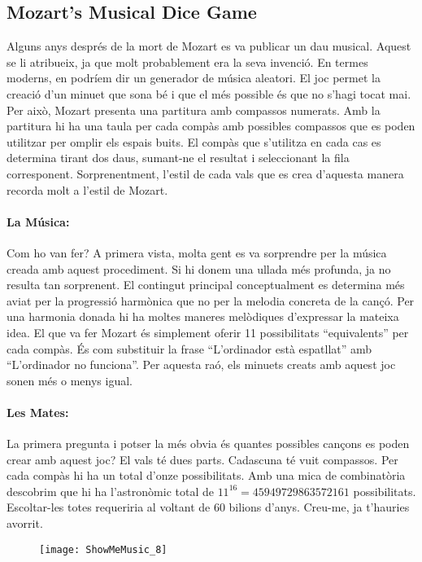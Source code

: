 \subsection{Mozart's Musical Dice Game}
Alguns anys després de la mort de Mozart es va publicar un dau musical. Aquest se li atribueix, ja que molt probablement era la seva invenció. En termes moderns, en podríem dir un generador de música aleatori. El joc permet la creació d'un minuet que sona bé i que el més possible és que no s'hagi tocat mai. Per això, Mozart presenta una partitura amb compassos numerats. Amb la partitura hi ha una taula per cada compàs amb possibles compassos que es poden utilitzar per omplir els espais buits. El compàs que s'utilitza en cada cas es determina tirant dos daus, sumant-ne el resultat i seleccionant la fila corresponent. Sorprenentment, l'estil de cada vals que es crea d'aquesta manera recorda molt a l'estil de Mozart.


\paragraph{La Música:} Com ho van fer? A primera vista, molta gent es va sorprendre per la música creada amb aquest procediment. Si hi donem una ullada més profunda, ja no resulta tan sorprenent. El contingut principal conceptualment es determina més aviat per la progressió harmònica que no per la melodia concreta de la cançó. Per una harmonia donada hi ha moltes maneres melòdiques d'expressar la mateixa idea. El que va fer Mozart és simplement oferir 11 possibilitats ``equivalents'' per cada compàs. És com substituir la frase ``L'ordinador està espatllat'' amb ``L'ordinador no funciona''. Per aquesta raó, els minuets creats amb aquest joc sonen més o menys igual.

\paragraph{Les Mates:} La primera pregunta i potser la més obvia és quantes possibles cançons es poden crear amb aquest joc? El vals té dues parts. Cadascuna té vuit compassos. Per cada compàs hi ha un total d'onze possibilitats. Amb una mica de combinatòria descobrim que hi ha l'astronòmic total de $11^{16} = 45 949 729 863 572 161$ possibilitats. Escoltar-les totes requeriria al voltant de 60 bilions d'anys. Creu-me, ja t'hauries avorrit.

\begin{figure}[!b]
\centering
\texttt{[image: ShowMeMusic\_8]}
\end{figure}


